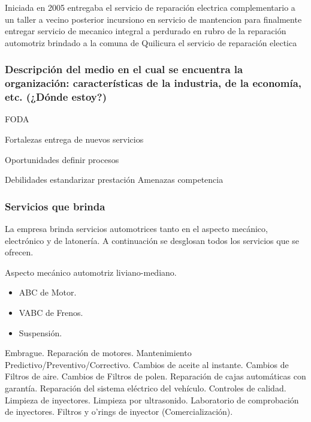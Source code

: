 \documentclass[
]{article}
\providecommand{\tightlist}{%
  \setlength{\itemsep}{0pt}\setlength{\parskip}{0pt}}
\begin{document}
Iniciada en 2005 entregaba el servicio de reparación electrica
complementario a un taller a vecino posterior incursiono en servicio de
mantencion para finalmente entregar servicio de mecanico integral a
perdurado en rubro de la reparación automotriz brindado a la comuna de
Quilicura el servicio de reparación electica

\hypertarget{descripciuxf3n-del-medio-en-el-cual-se-encuentra-la-organizaciuxf3n-caracteruxedsticas-de-la-industria-de-la-economuxeda-etc.-duxf3nde-estoy}{%
\subsubsection{Descripción del medio en el cual se encuentra la
organización: características de la industria, de la economía, etc.
(¿Dónde
estoy?)}\label{descripciuxf3n-del-medio-en-el-cual-se-encuentra-la-organizaciuxf3n-caracteruxedsticas-de-la-industria-de-la-economuxeda-etc.-duxf3nde-estoy}}

FODA

Fortalezas entrega de nuevos servicios

Oportunidades definir procesos

Debilidades estandarizar prestación Amenazas competencia

\hypertarget{servicios-que-brinda}{%
\subsubsection{Servicios que brinda}\label{servicios-que-brinda}}

La empresa brinda servicios automotrices tanto en el aspecto mecánico,
electrónico y de latonería. A continuación se desglosan todos los
servicios que se ofrecen.

Aspecto mecánico automotriz liviano-mediano.

\begin{itemize}
\tightlist
\item
  ABC de Motor.
\item
  VABC de Frenos.
\item
  Suspensión.
\end{itemize}

Embrague. Reparación de motores. Mantenimiento
Predictivo/Preventivo/Correctivo. Cambios de aceite al instante. Cambios
de Filtros de aire. Cambios de Filtros de polen. Reparación de cajas
automáticas con garantía. Reparación del sistema eléctrico del vehículo.
Controles de calidad. Limpieza de inyectores. Limpieza por ultrasonido.
Laboratorio de comprobación de inyectores. Filtros y o'rings de inyector
(Comercialización).
\end{document}
